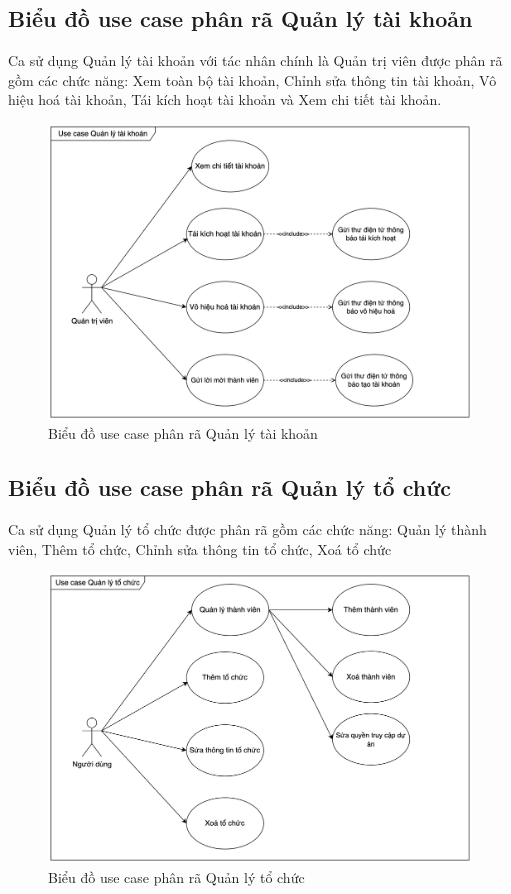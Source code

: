 \documentclass[../DoAn.tex]{subfiles}
\begin{document}
\subsection{Biểu đồ use case phân rã Quản lý tài khoản}
\label{subsection:2.2.2}
Ca sử dụng Quản lý tài khoản với tác nhân chính là Quản trị viên được phân rã gồm các chức năng:
Xem toàn bộ tài khoản, Chỉnh sửa thông tin tài khoản, Vô hiệu hoá tài khoản, Tái kích hoạt tài khoản và Xem chi tiết tài khoản.
\begin{figure}[H]
    \centering
    \includegraphics[width=1.0\linewidth]{Hinhve/AccountUseCases.png}
    \caption{Biểu đồ use case phân rã Quản lý tài khoản}
    \label{fig:AccountUseCases}
\end{figure}
\newpage

\subsection{Biểu đồ use case phân rã Quản lý tổ chức}
\label{subsection:2.2.3}
Ca sử dụng Quản lý tổ chức được phân rã gồm các chức năng: Quản lý thành viên, Thêm tổ chức, Chỉnh sửa thông tin tổ chức, Xoá tổ chức
\begin{figure}[H]
    \centering
    \includegraphics[width=1.0\linewidth]{Hinhve/WorkspaceUseCases.png}
    \caption{Biểu đồ use case phân rã Quản lý tổ chức}
    \label{fig:WorkspaceUseCases}
\end{figure}
\newpage
\end{document}
